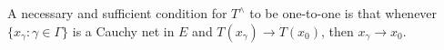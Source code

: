 A necessary and sufficient condition for $T^\wedge$ to be one-to-one is that whenever $\{x_\gamma : \gamma \in \Gamma\}$ is a Cauchy net in $E$ and $T(x_\gamma) \rightarrow T(x_0)$, then $x_\gamma \rightarrow x_0$.
